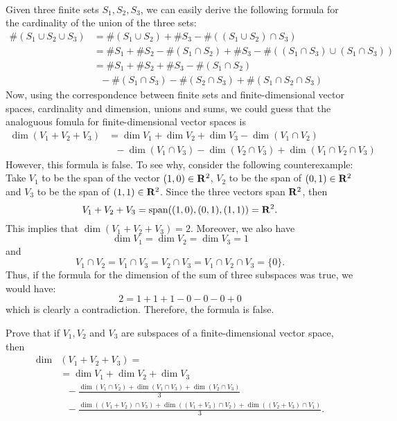 \begin{solution}
    \\ Given three finite sets $S_1, S_2, S_3$, we can easily derive the following formula for the cardinality of the union of the three sets:
    \begin{align*}
        \#(S_1 \cup S_2 \cup S_3) &= \#(S_1 \cup S_2) + \# S_3 - \# ((S_1 \cup S_2) \cap S_3) \\
        &= \#S_1 + \# S_2 - \# (S_1\cap S_2) + \# S_3 - \# ((S_1 \cap S_3) \cup (S_1 \cap S_3)) \\
        &= \# S_1 + \# S_2 + \# S_3 - \#(S_1 \cap S_2) \\
        & \ \ \ - \# (S_1 \cap S_3) - \# (S_2 \cap S_3) + \# (S_1 \cap S_2 \cap S_3)
    \end{align*}
    Now, using the correspondence between finite sets and finite-dimensional vector spaces, cardinality and dimension, unions and sums, we could guess that the analoguous fomula for finite-dimensional vector spaces is
    \begin{align*}
        \dim(V_1 + V_2 + V_3) &=  \dim V_1 + \dim V_2 + \dim V_3 - \dim(V_1 \cap V_2) \\
        & \ \ \ - \dim (V_1 \cap V_3) - \dim (V_2 \cap V_3) + \dim (V_1 \cap V_2 \cap V_3)
    \end{align*}
    However, this formula is false. To see why, consider the following counterexample: Take $V_1$ to be the span of the vector $(1, 0) \in \mathbf{R}^2$, $V_2$ to be the span of $(0,1) \in \mathbf{R}^2$ and $V_3$ to be the span of $(1,1) \in \mathbf{R}^2$. Since the three vectors span $\mathbf{R}^2$, then
    $$V_1 + V_2 + V_3 = \text{span}((1,0), (0,1), (1,1)) = \mathbf{R}^2.$$
    This implies that $\dim(V_1 + V_2 + V_3) = 2$. Moreover, we also have
    $$\dim V_1 = \dim V_2 = \dim V_3 = 1$$
    and 
    $$V_1 \cap V_2 = V_1 \cap V_3 = V_2 \cap V_3 = V_1 \cap V_2 \cap V_3 = \{0\}.$$
    Thus, if the formula for the dimension of the sum of three subspaces was true, we would have:
    $$2 = 1 + 1 + 1 - 0 - 0 - 0 + 0$$
    which is clearly a contradiction. Therefore, the formula is false. \\
\end{solution}

\begin{exercise}
    Prove that if $V_1, V_2$ and $V_3$ are subspaces of a finite-dimensional vector space, then
    \begin{align*}
        \dim & (V_1 + V_2 + V_3) = \\
        &= \dim V_1 + \dim V_2 + \dim V_3 \\
        & \ \ \ - \frac{\dim(V_1 \cap V_2) + \dim(V_1 \cap V_3) + \dim(V_2 \cap V_3)}{3} \\
        & \ \ \ - \frac{\dim((V_1 + V_2) \cap V_3) + \dim((V_1 + V_3) \cap V_2) + \dim((V_2 + V_3) \cap V_1)}{3}.
    \end{align*}
\end{exercise}

